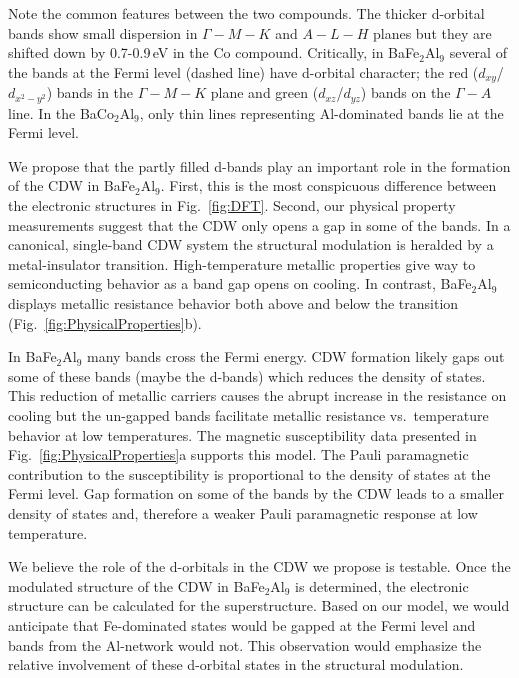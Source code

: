 \documentclass[journal=cmatex,manuscript=article]{achemso}
\begin{document}
Note the common features between the two compounds. The thicker d-orbital bands show small dispersion in $\Gamma-M-K$ and $A-L-H$ planes but they are shifted down by 0.7-0.9\,eV in the Co compound. Critically, in BaFe$_2$Al$_9$ several of the bands at the Fermi level (dashed line) have d-orbital character; the red ($d_{xy}$/$d_{x^2-y^2}$) bands in the $\Gamma-M-K$ plane and green ($d_{xz}$/$d_{yz}$) bands on the $\Gamma-A$ line. In the BaCo$_2$Al$_9$, only thin lines representing Al-dominated bands lie at the Fermi level. 

We propose that the partly filled d-bands play an important role in the formation of the CDW in BaFe$_2$Al$_9$. First, this is the most conspicuous difference between the electronic structures in Fig.~\ref{fig:DFT}. Second, our physical property measurements suggest that the CDW only opens a gap in some of the bands. In a canonical, single-band CDW system the structural modulation is heralded by a metal-insulator transition. High-temperature metallic properties give way to semiconducting behavior as a band gap opens on cooling.\cite{Gruner1994_DensityWavesInSolids} In contrast, BaFe$_2$Al$_9$ displays metallic resistance behavior both above and below the transition (Fig.~\ref{fig:PhysicalProperties}b). 

In BaFe$_2$Al$_9$ many bands cross the Fermi energy. CDW formation likely gaps out some of these bands (maybe the d-bands) which reduces the density of states. This reduction of metallic carriers causes the abrupt increase in the resistance on cooling but the un-gapped bands facilitate metallic resistance vs.~temperature behavior at low temperatures. The magnetic susceptibility data presented in Fig.~\ref{fig:PhysicalProperties}a supports this model. The Pauli paramagnetic contribution to the susceptibility is proportional to the density of states at the Fermi level.\cite{Blundell2001_MagnetismInCondensedMatter} Gap formation on some of the bands by the CDW leads to a smaller density of states and, therefore a weaker Pauli paramagnetic response at low temperature. 

We believe the role of the d-orbitals in the CDW we propose is testable. Once the modulated structure of the CDW in BaFe$_2$Al$_9$ is determined, the electronic structure can be calculated for the superstructure. Based on our model, we would anticipate that Fe-dominated states would be gapped at the Fermi level and bands from the Al-network would not. This observation would emphasize the relative involvement of these d-orbital states in the structural modulation.
\end{document}
